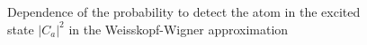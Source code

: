 \begin{figure}
\centering



\caption{Dependence of the probability to detect the atom in the excited
  state $\left|C_{a}\right|^2$ in the Weisskopf-Wigner approximation}
\label{fig:part1:vaickopf}
\end{figure}
